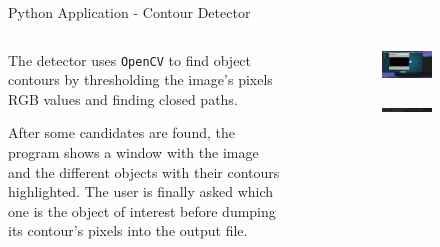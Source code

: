 \begin{frame}{Python Application - Contour Detector}
    \begin{columns}
        \begin{column}{.4\linewidth}
            The detector uses \texttt{OpenCV} to find object contours by thresholding the image's pixels RGB values and finding closed paths.

            After some candidates are found, the program shows a window with the image and the different objects with their contours highlighted. The user is finally asked which one is the object of interest before dumping its contour's pixels into the output file.
        \end{column}
        \begin{column}{.6\linewidth}
            \begin{figure}
                \begin{center}
                    \begin{subfigure}{\textwidth}
                        \centering
                        \includegraphics[width=\textwidth]{media/ContourDetector_Detection.png}
                    \end{subfigure}
                    \begin{subfigure}{\textwidth}
                        \centering
                        \includegraphics[width=\textwidth]{media/ContourDetector_Prompt.png}
                    \end{subfigure}
                \end{center}
            \end{figure}
        \end{column}
    \end{columns}
\end{frame}

